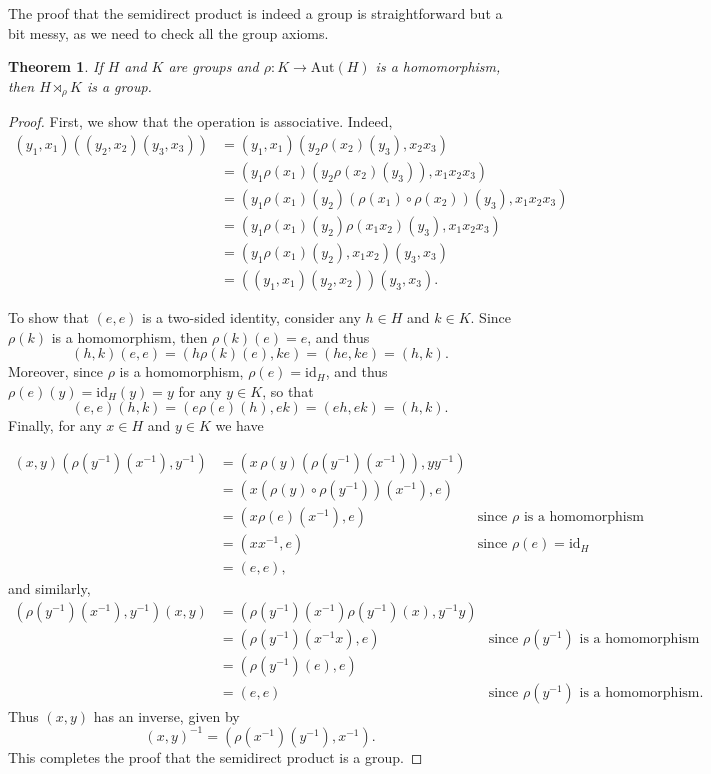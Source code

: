 \documentclass[12pt]{report}
\newtheorem{theorem}{Theorem}[chapter]
\numberwithin{equation}{section}
\numberwithin{theorem}{chapter}
\theoremstyle{definition}
\newtheorem*{basic properties}{Basic Properties}
\newtheorem*{Important Remark}{Important Remark}
\def\sdp{\rtimes}
\begin{document}
  
 

 	
The proof that the semidirect product is indeed a group is straightforward but a bit messy, as we need to check all the group axioms.


\begin{theorem}\label{semidirect product}
If $H$ and $K$ are groups and $\rho\!: K \to \mathrm{Aut}(H)$ is a homomorphism, then $H \sdp_\rho K$ is a group.
\end{theorem}

\begin{proof} 
First, we show that the operation is associative. Indeed,
$$\begin{aligned}
(y_1,x_1) \left( (y_2, x_2) (y_3, x_3) \right)
& = (y_1,x_1) (y_2\rho(x_2)(y_3), x_2x_3) \\
& = (y_1\rho(x_1)\left(y_2\rho(x_2)(y_3)\right), x_1x_2x_3)\\
& = (y_1\rho(x_1)(y_2)(\rho(x_1)\circ \rho(x_2))(y_3), x_1x_2x_3)\\
& = (y_1\rho(x_1)(y_2)\rho(x_1x_2)(y_3), x_1x_2x_3)\\
& = (y_1 \rho(x_1)(y_2), x_1 x_2)  (y_3, x_3) \\
& = \left( (y_1,x_1) (y_2, x_2) \right) (y_3, x_3).
\end{aligned}$$

To show that $(e,e)$ is a two-sided identity, consider any $h \in H$ and $k \in K$. Since $\rho(k)$ is a homomorphism, then $\rho(k)(e) = e$, and thus
$$(h,k)(e,e) = (h\rho(k)(e),ke) = (he,ke) = (h,k).$$
Moreover, since $\rho$ is a homomorphism, $\rho(e) = \mathrm{id}_H$, and thus $\rho(e)(y) = \mathrm{id}_H(y)=y$ for any $y \in K$, so that
$$(e,e)(h,k) = (e\rho(e)(h),ek) = (eh,ek)=(h,k).$$
Finally, for any $x \in H$ and $y \in K$ we have

$$\begin{aligned}
(x,y) (\rho(y^{-1})(x^{-1}), y^{-1}) &= (x \, \rho(y)\left(\rho(y^{-1})(x^{-1}) \right), yy^{-1})\\
& = (x (\rho(y) \circ \rho(y^{-1}))(x^{-1}), e) \\
&= (x \rho(e)(x^{-1}), e) & \textrm{since $\rho$ is a homomorphism} \\
& = (xx^{-1},e) & \text{since } \rho(e) = \mathrm{id}_H\\ 
& =(e,e),
\end{aligned}$$
and similarly,
$$\begin{aligned}
(\rho(y^{-1})(x^{-1}), y^{-1}) (x,y) &= (\rho(y^{-1})(x^{-1}) \rho(y^{-1})(x),y^{-1}y) \\
& = (\rho(y^{-1})(x^{-1}x), e) & \textrm{since } \rho(y^{-1}) \text{ is a homomorphism} \\
& = (\rho(y^{-1})(e), e) \\
& = (e, e) & \textrm{since } \rho(y^{-1}) \text{ is a homomorphism.} 
\end{aligned}$$
Thus $(x,y)$ has an inverse, given by
$$(x,y)^{-1} = (\rho(x^{-1})(y^{-1}) ,x^{-1}).$$
This completes the proof that the semidirect product is a group.
\end{proof}
\end{document}
